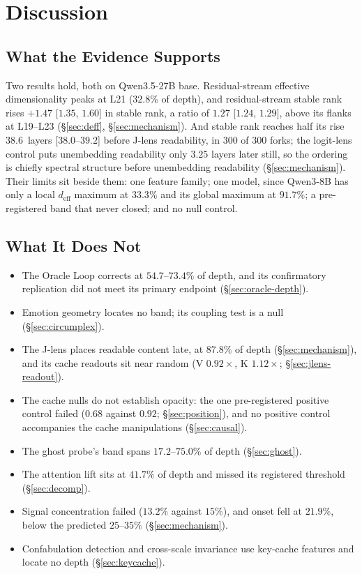 \documentclass[11pt,a4paper]{article}
\begin{document}
\section{Discussion}
\label{sec:discussion}

\subsection{What the Evidence Supports}

Two results hold, both on Qwen3.5-27B base. Residual-stream effective
dimensionality peaks at L21 ($32.8\%$ of depth), and residual-stream
stable rank rises
$+1.47$ [$1.35$, $1.60$] in stable rank, a ratio of $1.27$ [$1.24$, $1.29$],
above its flanks at L19--L23
(\S\ref{sec:deff}, \S\ref{sec:mechanism}). And stable rank reaches half
its rise $38.6$~layers [$38.0$--$39.2$] before J-lens readability, in 300 of 300 forks; the logit-lens control puts unembedding readability
only $3.25$ layers later still, so the ordering is chiefly spectral
structure before unembedding readability (\S\ref{sec:mechanism}). Their
limits sit beside them: one feature family; one model, since Qwen3-8B
has only a local $d_\text{eff}$ maximum at $33.3\%$ and its global
maximum at $91.7\%$; a pre-registered band that never closed; and no
null control.

\subsection{What It Does Not}

\begin{itemize}[nosep]
\item The Oracle Loop corrects at $54.7$--$73.4\%$ of depth, and its
  confirmatory replication did not meet its primary endpoint
  (\S\ref{sec:oracle-depth}).
\item Emotion geometry locates no band; its coupling test is a null
  (\S\ref{sec:circumplex}).
\item The J-lens places readable content late, at $87.8\%$ of depth
  (\S\ref{sec:mechanism}), and its cache readouts sit near random
  (V $0.92\times$, K $1.12\times$; \S\ref{sec:jlens-readout}).
\item The cache nulls do not establish opacity: the one pre-registered
  positive control failed ($0.68$ against $0.92$; \S\ref{sec:position}),
  and no positive control accompanies the cache manipulations
  (\S\ref{sec:causal}).
\item The ghost probe's band spans $17.2$--$75.0\%$ of depth
  (\S\ref{sec:ghost}).
\item The attention lift sits at $41.7\%$ of depth and missed its
  registered threshold (\S\ref{sec:decomp}).
\item Signal concentration failed ($13.2\%$ against $15\%$), and onset
  fell at $21.9\%$, below the predicted $25$--$35\%$ (\S\ref{sec:mechanism}).
\item Confabulation detection and cross-scale invariance use key-cache
  features and locate no depth (\S\ref{sec:keycache}).
\end{itemize}
\end{document}
